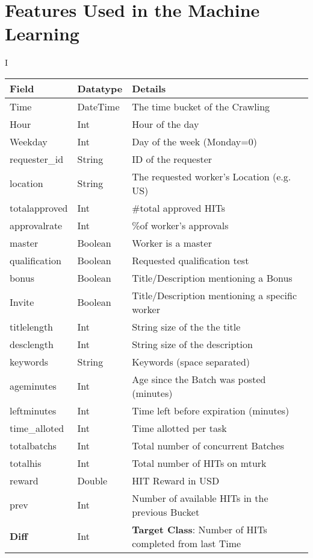 \appendix

\section{Features Used in the Machine Learning}
I
\begin{table}[h]
\begin{tabular}{|l|l|l|}
\hline
\textbf{Field} & \textbf{Datatype} & \textbf{Details}\\ \hline\hline
Time     &  DateTime & The time bucket of the Crawling\\ \hline
Hour      & Int    &  Hour of the day   \\ \hline
Weekday      & Int   &  Day of the week (Monday=0)  \\ \hline
requester\_id     & String &   ID of the requester       \\ \hline
location      & String &  The requested worker's Location (e.g. US)       \\ \hline
totalapproved    & Int &  \#total approved HITs      \\ \hline
approvalrate      & Int&   \%of worker's approvals       \\ \hline
master     &  Boolean    &  Worker is a master  \\ \hline
qualification    &Boolean  &   Requested qualification test       \\ \hline
bonus      &Boolean    &  Title/Description mentioning a Bonus    \\ \hline
Invite      & Boolean     &    Title/Description mentioning a specific worker\\ \hline
titlelength      & Int&   String size of the the title       \\ \hline
desclength    & Int &  String size of the description      \\ \hline
keywords      & String & Keywords (space separated)        \\ \hline
ageminutes      &  Int  &  Age since the Batch was posted (minutes)   \\ \hline
leftminutes      & Int  & Time left before expiration (minutes) \\ \hline
time\_alloted    & Int &  Time allotted per task   \\ \hline
totalbatchs      & Int  & Total number of concurrent Batches      \\ \hline
totalhis      & Int    &  Total number of HITs on mturk   \\ \hline
reward    & Double      & HIT Reward in USD  \\ \hline
prev      & Int     &  Number of available HITs in the previous Bucket  \\ \hline
\textbf{Diff}      & Int &   \textbf{Target Class}: Number of HITs completed from last Time \\ \hline
\end{tabular}
\end{table}